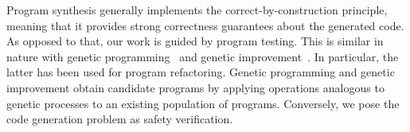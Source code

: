\documentclass[sigconf,review,anonymous]{acmart}
\begin{document}





Program synthesis generally implements the correct-by-con\-struc\-tion
principle, meaning that it provides strong correctness guarantees about the
generated code.  As opposed to that, our work is guided by program testing. 
This is similar in nature with genetic programming~\cite{Koza92} and genetic
improvement~\cite{DBLP:journals/dagstuhl-reports/PetkeGFL18,7911210}.  In
particular, the latter has been used for program refactoring.  Genetic
programming and genetic improvement obtain candidate programs by applying
operations analogous to genetic processes to an existing population of
programs.  Conversely, we pose the code generation problem as safety
verification.

%
%
\end{document}

